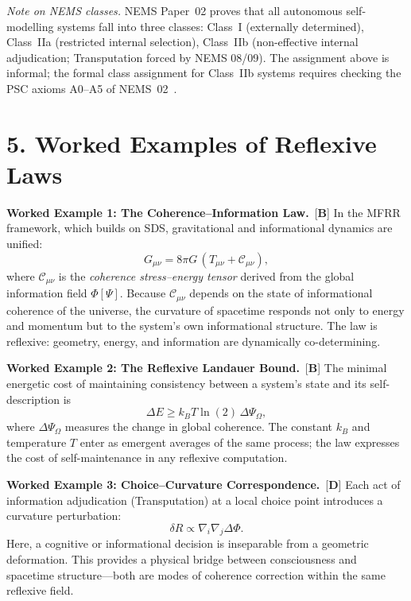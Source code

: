 \documentclass[11pt]{article}
\newcommand{\CatB}{\textbf{B}}
\newcommand{\CatD}{\textbf{D}}
\begin{document}
\noindent\textit{Note on NEMS classes.} NEMS Paper~02 proves that all
autonomous self-modelling systems fall into three classes:
Class~I (externally determined), Class~IIa (restricted internal
selection), Class~IIb (non-effective internal adjudication; Transputation
forced by NEMS 08/09).
The assignment above is informal; the formal class assignment for
Class~IIb systems requires checking the PSC axioms A0--A5 of
NEMS~02~\cite{SpivackNEMSTheorem}.

\section*{5. Worked Examples of Reflexive Laws}

\textbf{Worked Example 1: The Coherence--Information Law.}~[$\CatB$]
In the MFRR framework, which builds on SDS, gravitational and
informational dynamics are unified:
\[
G_{\mu\nu} = 8\pi G\,(T_{\mu\nu} + \mathcal{C}_{\mu\nu}),
\]
where $\mathcal{C}_{\mu\nu}$ is the \emph{coherence stress--energy
tensor} derived from the global information field $\Phi[\Psi]$.
Because $\mathcal{C}_{\mu\nu}$ depends on the state of informational
coherence of the universe, the curvature of spacetime responds not only
to energy and momentum but to the system's own informational structure.
The law is reflexive: geometry, energy, and information are dynamically
co-determining.

\vspace{0.3cm}

\textbf{Worked Example 2: The Reflexive Landauer Bound.}~[$\CatB$]
The minimal energetic cost of maintaining consistency between a
system's state and its self-description is
\[
\Delta E \ge k_B T \ln(2)\,\Delta\Psi_\Omega,
\]
where $\Delta\Psi_\Omega$ measures the change in global coherence.
The constant \(k_B\) and temperature \(T\) enter as emergent averages
of the same process; the law expresses the cost of self-maintenance in
any reflexive computation.

\vspace{0.3cm}

\textbf{Worked Example 3: Choice--Curvature Correspondence.}~[$\CatD$]
Each act of information adjudication (Transputation) at a local choice
point introduces a curvature perturbation:
\[
\delta R \propto \nabla_i \nabla_j \Delta\Phi.
\]
Here, a cognitive or informational decision is inseparable from a
geometric deformation.
This provides a physical bridge between consciousness and spacetime
structure---both are modes of coherence correction within the same
reflexive field.
\end{document}
